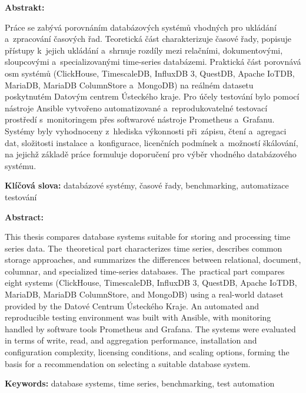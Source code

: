 \textsc{\nazevcz}

\textbf{Abstrakt:}

Práce se zabývá porovnáním databázových systémů vhodných pro ukládání a~zpracování časových řad. 
Teoretická část charakterizuje časové řady, popisuje přístupy k~jejich ukládání a~shrnuje rozdíly mezi relačními, dokumentovými, sloupcovými a~specializovanými time-series databázemi.
Praktická část porovnává osm systémů (ClickHouse, TimescaleDB, InfluxDB 3, QuestDB, Apache IoTDB, MariaDB, MariaDB ColumnStore a~MongoDB) na reálném datasetu poskytnutém Datovým centrem Ústeckého kraje. 
Pro účely testování bylo pomocí nástroje Ansible vytvořeno automatizované a~reprodukovatelné testovací prostředí s~monitoringem přes softwarové nástroje Prometheus a~Grafanu. 
Systémy byly vyhodnoceny z~hlediska výkonnosti při~zápisu, čtení a~agregaci dat, složitosti instalace a~konfigurace, licenčních podmínek a~možností škálování, na jejichž základě práce formuluje doporučení pro výběr vhodného databázového systému.

\textbf{Klíčová slova:} databázové systémy, časové řady, benchmarking, automatizace testování

\bigskip


\textsc{\nazeven}

\textbf{Abstract:}

This thesis compares database systems suitable for storing and processing time series data.
\mbox{The~theoretical} part characterizes time series, describes common storage approaches, and summarizes the differences between relational, document, columnar, and specialized time-series databases.
The~practical part compares eight systems (ClickHouse, TimescaleDB, InfluxDB 3, QuestDB, Apache IoTDB, MariaDB, MariaDB ColumnStore, and MongoDB) using a real-world dataset provided by the Datové Centrum Ústeckého Kraje.
An automated and reproducible testing environment was built with Ansible, with monitoring handled by software tools Prometheus and Grafana. 
The systems were evaluated in terms of write, read, and aggregation performance, installation and configuration complexity, licensing conditions, and scaling options, forming the basis for a recommendation on selecting a suitable database system.

\textbf{Keywords:} database systems, time series, benchmarking, test automation